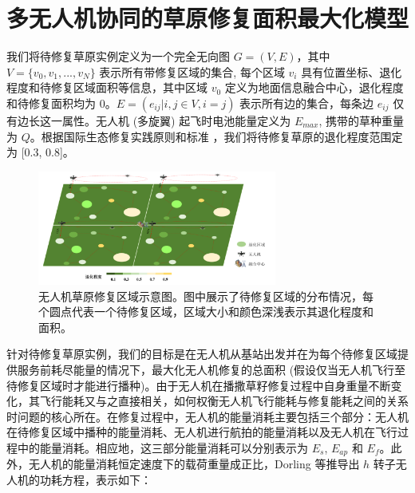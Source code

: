 \documentclass[AutoFakeBold]{LZUThesis}
\begin{document}


\chapter{多无人机协同的草原修复面积最大化模型}

我们将待修复草原实例定义为一个完全无向图 $G = (V, E)$，其中 $V = \{v_0, v_1, ..., v_N \}$ 表示所有带修复区域的集合, 每个区域 $v_i$ 具有位置坐标、退化程度和待修复区域面积等信息，其中区域 $v_0$ 定义为地面信息融合中心，退化程度和待修复面积均为 0。$E = (e_{ij} |i, j \in V, i = j)$ 表示所有边的集合，每条边 $e_{ij}$ 仅有边长这一属性。无人机 (多旋翼) 起飞时电池能量定义为 $E_{max}$, 携带的草种重量为 $Q$。根据国际生态修复实践原则和标准\cite{gann2019international} ，我们将待修复草原的退化程度范围定为 [0.3, 0.8]。

\begin{figure}[htbp]
	\centering
	\includegraphics[width=0.7\textwidth]{figures/多无人机修复退化区域实例.png}
	\caption{无人机草原修复区域示意图。图中展示了待修复区域的分布情况，每个圆点代表一个待修复区域，区域大小和颜色深浅表示其退化程度和面积。}
	\label{fig:restored-areas}
\end{figure}

针对待修复草原实例，我们的目标是在无人机从基站出发并在为每个待修复区域提供服务前耗尽能量的情况下，最大化无人机修复的总面积 (假设仅当无人机飞行至待修复区域时才能进行播种)。由于无人机在播撒草籽修复过程中自身重量不断变化，其飞行能耗又与之直接相关，如何权衡无人机飞行能耗与修复能耗之间的关系时问题的核心所在。在修复过程中，无人机的能量消耗主要包括三个部分：无人机在待修复区域中播种的能量消耗、无人机进行航拍的能量消耗以及无人机在飞行过程中的能量消耗。相应地，这三部分能量消耗可以分别表示为 $E_s$, $E_{ap}$ 和 $E_f$。此外，无人机的能量消耗恒定速度下的载荷重量成正比，Dorling\cite{dorling2016vehicle} 等推导出 $h$ 转子无人机的功耗方程，表示如下：
\end{document}
